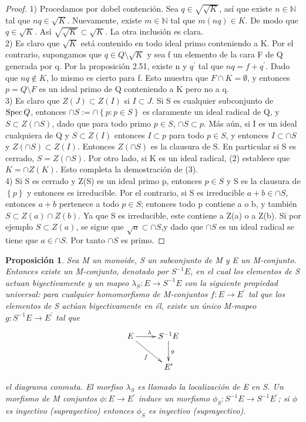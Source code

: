 \documentclass[12pt,spanish]{amsart}
\newcommand{\bb}[1]{\mathbb{#1}}
\newcommand{\set}[1]{\left\{{#1}\right\}}
\def\Spec{\mathop{\mbox{\normalfont Spec}}\nolimits}
\newtheorem{prop}[Theorem]{Proposición}
\theoremstyle{definition}
\theoremstyle{remark}
\begin{document}
\begin{proof}
1) Procedamos por dobel contención. Sea $q\in \sqrt{\sqrt{K}}$, así que existe $n\in \bb{N}$ tal que $nq \in \sqrt{K}$. Nuevamente, existe $m\in \bb{N}$ tal que $m(nq)\in K$. De modo que $q\in \sqrt{K}$. Así $\sqrt{\sqrt{K}} \subset \sqrt{K}$. La otra inclusión es clara. \\ 
2) Es claro que $\sqrt{K}$ está contenido en todo ideal primo conteniendo a K. Por el contrario, supongamos que $q\in Q\setminus  \sqrt{K}$ y sea f un elemento de la cara F de Q generada por q. Por la proposición 2.51, existe n y $q^{\prime}$ tal que $nq=f+q^{\prime}$. Dado que $nq\notin K$, lo mismo es cierto para f. Esto muestra que $F\cap K = \emptyset$, y entonces $p= Q \setminus F$ es un ideal primo de Q conteniendo a K pero no a q. \\
3) Es claro que $Z(J) \subset Z(I)$ si $I\subset J$. Si S es cualquier subconjunto de $\Spec{Q}$, entonces $\cap S:= \cap \set{p:p\in S}$ es claramente un ideal radical de Q, y $S\subset Z(\cap S)$, dado que para todo primo $p\in S$, $\cap S \subset p$. Más aún, si I es un ideal cualquiera de Q y $S\subset Z(I)$ entonces $I\subset p$ para todo $p\in S$, y entonces $I \subset \cap S$ y $Z(\cap S) \subset Z(I)$. Entonces $Z(\cap S)$ es la clausura de S. En particular si S es cerrado, $S=Z(\cap S)$. Por otro lado, si K es un ideal radical, (2) establece que $K=\cap Z(K)$. Esto completa la demostración de (3). \\
4)  Si S es cerrado y Z(S) es un ideal primo p, entonces $p\in S$ y S es la clausura de $\set{p}$ y entonces es irreducible. Por el contrario, si S es irreducible $a+b \in \cap S$, entonces $a+b$ pertenece a todo $p\in S$; entonces todo p contiene a o b, y también $S \subset Z(a) \cap Z(b)$. Ya que  S es irreducible, este contiene a Z(a) o a Z(b). Si por ejemplo $S \subset Z(a)$, se sigue que $\sqrt{a} \subset \cap S$,y dado que $\cap S$ es un ideal radical se tiene que $a \in \cap S$. Por tanto $\cap S$ es primo.     
\end{proof}

\begin{prop}
Sea M un monoide, S un subconjunto de M y E un M-conjunto. Entonces existe un M-conjunto, denotado por $S^{-1}E$, en el cual los elementos de S actuan biyectivamente y un mapeo $\lambda_{S}:E\to S^{-1}E$ con la siguiente propiedad universal: para cualquier homomorfismo de M-conjuntos $f:E \to E^{\prime}$ tal que los elementos de S actúan biyectivamente en él, existe un único M-mapeo $g:S^{-1}E \to E^{\prime}$ tal que 
$$\xymatrix{
E \ar[dr]_f \ar[r]^\lambda & S^{-1}E \ar[d]^g \\
& E^{\prime}
}
$$

el diagrama conmuta. El morfiso $\lambda_{S}$ es llamado la localización de E en S. Un morfismo de M conjuntos $\phi:E\to E^{\prime}$ induce un morfismo $\phi_{S}:S^{-1}E \to S^{-1}E^{\prime}$; si $\phi$ es inyectivo (suprayectivo) entonces $\phi_{S}$ es inyectivo (suprayectivo).  
\end{prop}
\end{document}
